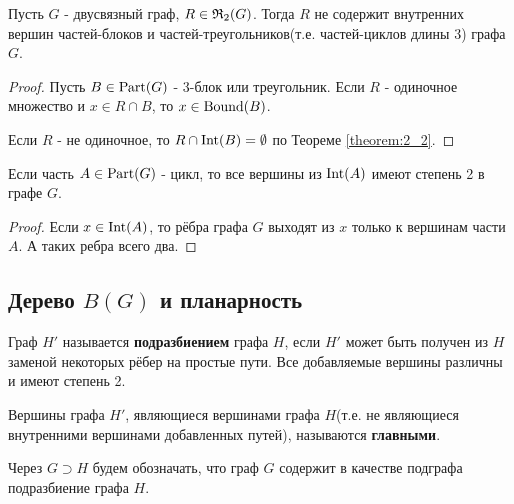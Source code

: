 \begin{crly}[Следствие 2.1] \label{corollary:2_1}
	Пусть $G$ - двусвязный граф, $R \in \mathfrak{R}_2(G)$. Тогда $R$ не содержит внутренних вершин частей-блоков и частей-треугольников(т.е. частей-циклов длины 3) графа $G$.
\end{crly}
\begin{proof}
	Пусть $B \in \operatorname{Part}(G)$ - 3-блок или треугольник.
	Если  $R$ - одиночное множество и $x \in R \cap B$, то $x \in \operatorname{Bound}(B)$.
	
	Если  $R$ - не одиночное, то $R \cap \operatorname{Int}(B) = \emptyset$ по Теореме \ref{theorem:2_2}.
\end{proof}

\begin{crly}[Следствие 2.2] \label{corollary:2_2}
	Если часть $A \in \operatorname{Part}(G)$ - цикл, то все вершины из  $\operatorname{Int}(A)$ имеют степень 2 в графе $G$.
\end{crly}
\begin{proof}
	Если $x \in \operatorname{Int}(A)$, то рёбра графа $G$ выходят из $x$ только к вершинам части  $A$.
	А таких ребра всего два.
\end{proof}

\subsection{Дерево $B(G)$ и планарность}

\begin{df}[Подразбиение]
	Граф $H'$ называется \textbf{подразбиением} графа $H$, если  $H'$ может быть получен из  $H$ заменой некоторых рёбер на простые пути.
	Все добавляемые вершины различны и имеют степень 2. 

	Вершины графа $H'$, являющиеся вершинами графа  $H$(т.е. не являющиеся внутренними вершинами добавленных путей), называются \textbf{главными}.
\end{df}

\begin{prop}
	Через $G \supset H$ будем обозначать, что граф  $G$ содержит в качестве подграфа подразбиение графа  $H$.
\end{prop}

